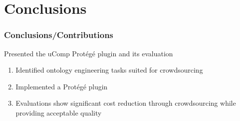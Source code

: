 \documentclass{beamer}
\begin{document}
%

\section{Conclusions}
\begin{frame}
  \frametitle{Conclusions/Contributions}

 Presented the uComp Prot\'eg\'e plugin and its evaluation
\vspace{0.7cm}

    \begin{enumerate}
       \item Identified ontology engineering tasks suited for crowdsourcing 
       \item Implemented a Prot\'eg\'e plugin 
       \item Evaluations show significant cost reduction through crowdsourcing while providing acceptable quality
    \end{enumerate}
\end{frame}
\end{document}

